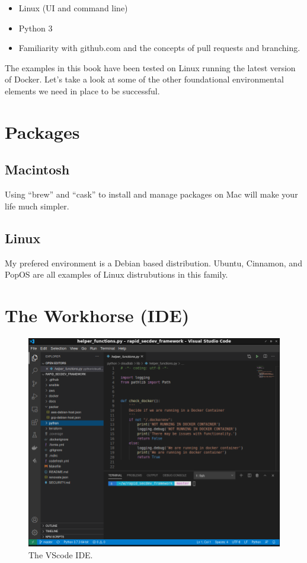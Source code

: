 \begin{itemize}
	\item
	    Linux (UI and command line)
	\item 
        Python 3
	\item
	    Familiarity with github.com and the concepts of pull requests and branching.
\end{itemize}

\justify{}
The examples in this book have been tested on Linux running the latest version of Docker. Let's take a look at some
of the other foundational environmental elements we need in place to be successful.

\section{Packages}

\subsection{Macintosh}

Using ``brew'' and ``cask'' to install and manage packages on Mac will make your life much simpler.

\subsection{Linux}

My prefered environment is a Debian based distribution. Ubuntu, Cinnamon, and PopOS are all examples of 
Linux distrubutions in this family.

\section{The Workhorse (IDE)}

\begin{figure}[!htb]
\centering
\includegraphics[scale=0.45]{images/setup-vscode.png}
\caption{The VScode IDE.}
\end{figure}

